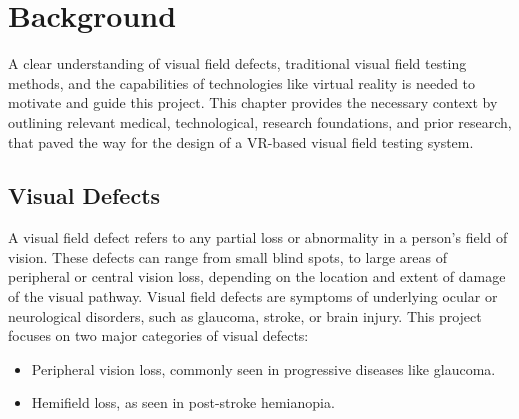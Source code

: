 \documentclass{l4proj}
\begin{document}


\chapter{Background}

A clear understanding of visual field defects, traditional visual field testing methods, and the capabilities of technologies like virtual reality is needed to motivate and guide this project. This chapter provides the necessary context by outlining relevant medical, technological, research foundations, and prior research, that paved the way for the design of a VR-based visual field testing system.


\section{Visual Defects}

A visual field defect refers to any partial loss or abnormality in a person’s field of vision. These defects can range from small blind spots, to large areas of peripheral or central vision loss, depending on the location and extent of damage of the visual pathway. Visual field defects are symptoms of underlying ocular or neurological disorders, such as glaucoma, stroke, or brain injury. This project focuses on two major categories of visual defects:
\begin{itemize}
    \item Peripheral vision loss, commonly seen in progressive diseases like glaucoma.
    \item Hemifield loss, as seen in post-stroke hemianopia.
\end{itemize}
\end{document}
